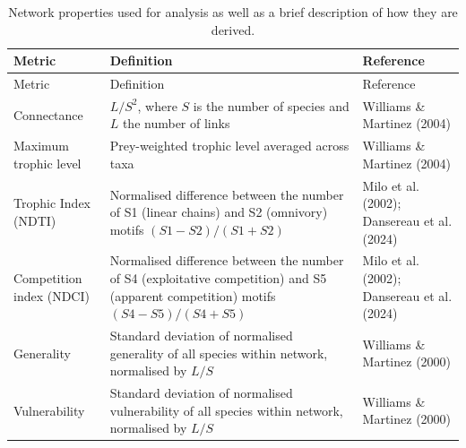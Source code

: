 \documentclass[
]{article}
\begin{document}
\begin{longtable}[]{@{}
  >{\raggedright\arraybackslash}p{}
  >{\raggedright\arraybackslash}p{}
  >{\raggedright\arraybackslash}p{}@{}}
\caption{Network properties used for analysis as well as a brief
description of how they are
derived.}\label{tbl-properties}\tabularnewline
\toprule\noalign{}
\begin{minipage}[b]{\linewidth}\raggedright
Metric
\end{minipage} & \begin{minipage}[b]{\linewidth}\raggedright
Definition
\end{minipage} & \begin{minipage}[b]{\linewidth}\raggedright
Reference
\end{minipage} \\
\midrule\noalign{}
\endfirsthead
\toprule\noalign{}
\begin{minipage}[b]{\linewidth}\raggedright
Metric
\end{minipage} & \begin{minipage}[b]{\linewidth}\raggedright
Definition
\end{minipage} & \begin{minipage}[b]{\linewidth}\raggedright
Reference
\end{minipage} \\
\midrule\noalign{}
\endhead
\bottomrule\noalign{}
\endlastfoot
Connectance & \(L/S^2\), where \(S\) is the number of species and \(L\)
the number of links & Williams \& Martinez (2004) \\
Maximum trophic level & Prey-weighted trophic level averaged across taxa
& Williams \& Martinez (2004) \\
Trophic Index (NDTI) & Normalised difference between the number of S1
(linear chains) and S2 (omnivory) motifs \((S1 - S2)/(S1 + S2)\) & Milo
et al. (2002); Dansereau et al. (2024) \\
Competition index (NDCI) & Normalised difference between the number of
S4 (exploitative competition) and S5 (apparent competition) motifs
\((S4 - S5)/(S4 + S5)\) & Milo et al. (2002); Dansereau et al. (2024) \\
Generality & Standard deviation of normalised generality of all species
within network, normalised by \(L/S\) & Williams \& Martinez (2000) \\
Vulnerability & Standard deviation of normalised vulnerability of all
species within network, normalised by \(L/S\) & Williams \& Martinez
(2000) \\
\end{longtable}
\end{document}
